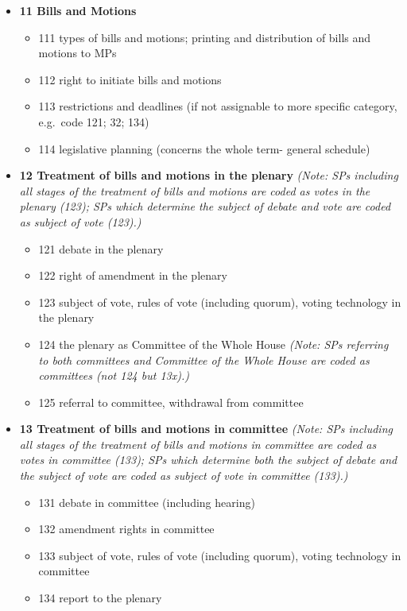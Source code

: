 \documentclass[]{article}
\providecommand{\tightlist}{%
  \setlength{\itemsep}{0pt}\setlength{\parskip}{0pt}}
\begin{document}
\begin{itemize}
\tightlist
\item
  \textbf{11 Bills and Motions}

  \begin{itemize}
  \tightlist
  \item
    111 types of bills and motions; printing and distribution of bills
    and motions to MPs
  \item
    112 right to initiate bills and motions
  \item
    113 restrictions and deadlines (if not assignable to more specific
    category, e.g.~code 121; 32; 134)
  \item
    114 legislative planning (concerns the whole term- general schedule)
  \end{itemize}
\item
  \textbf{12 Treatment of bills and motions in the plenary} \emph{(Note:
  SPs including all stages of the treatment of bills and motions are
  coded as votes in the plenary (123); SPs which determine the subject
  of debate and vote are coded as subject of vote (123).)}

  \begin{itemize}
  \tightlist
  \item
    121 debate in the plenary
  \item
    122 right of amendment in the plenary
  \item
    123 subject of vote, rules of vote (including quorum), voting
    technology in the plenary
  \item
    124 the plenary as Committee of the Whole House \emph{(Note: SPs
    referring to both committees and Committee of the Whole House are
    coded as committees (not 124 but 13x).)}
  \item
    125 referral to committee, withdrawal from committee
  \end{itemize}
\item
  \textbf{13 Treatment of bills and motions in committee} \emph{(Note:
  SPs including all stages of the treatment of bills and motions in
  committee are coded as votes in committee (133); SPs which determine
  both the subject of debate and the subject of vote are coded as
  subject of vote in committee (133).)}

  \begin{itemize}
  \tightlist
  \item
    131 debate in committee (including hearing)
  \item
    132 amendment rights in committee
  \item
    133 subject of vote, rules of vote (including quorum), voting
    technology in committee
  \item
    134 report to the plenary
  \end{itemize}
\end{itemize}
\end{document}
